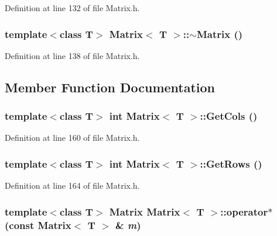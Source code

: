 Definition at line 132 of file Matrix.h.

\hypertarget{classMatrix_a91aa704de674203e96aece9e1955ccd3}{
\subsubsection[{$\sim$Matrix}]{\setlength{\rightskip}{0pt plus 5cm}template$<$class T$>$ {\bf Matrix}$<$ T $>$::$\sim${\bf Matrix} ()}}
\label{classMatrix_a91aa704de674203e96aece9e1955ccd3}


Definition at line 138 of file Matrix.h.



\subsection{Member Function Documentation}
\hypertarget{classMatrix_a3ea3fe8edc613dc1f3ef33f0f0a06c61}{
\subsubsection[{GetCols}]{\setlength{\rightskip}{0pt plus 5cm}template$<$class T$>$ int {\bf Matrix}$<$ T $>$::GetCols ()}}
\label{classMatrix_a3ea3fe8edc613dc1f3ef33f0f0a06c61}


Definition at line 160 of file Matrix.h.

\hypertarget{classMatrix_abc5ab9d53d31566a17dfc8a24fc60aa6}{
\subsubsection[{GetRows}]{\setlength{\rightskip}{0pt plus 5cm}template$<$class T$>$ int {\bf Matrix}$<$ T $>$::GetRows ()}}
\label{classMatrix_abc5ab9d53d31566a17dfc8a24fc60aa6}


Definition at line 164 of file Matrix.h.

\hypertarget{classMatrix_ae9307b29ba230013f0fce5ebf8e7fecd}{
\subsubsection[{operator$\ast$}]{\setlength{\rightskip}{0pt plus 5cm}template$<$class T$>$ {\bf Matrix} {\bf Matrix}$<$ T $>$::operator$\ast$ (const {\bf Matrix}$<$ T $>$ \& {\em m})}}
\label{classMatrix_ae9307b29ba230013f0fce5ebf8e7fecd}


